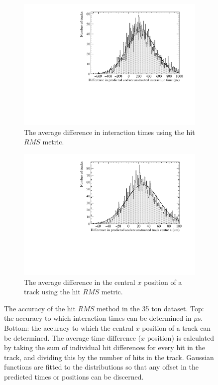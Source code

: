 \begin{figure}
  \centering
  \begin{subfigure}{0.6\textwidth}
    \centering
    \includegraphics[width=\textwidth]{Data_AvTimeDiff_RMS}
    \caption{The average difference in interaction times using the hit $RMS$ metric.}
    \label{fig:DiffDataAvDiff_RMS_T}
  \end{subfigure}

  \begin{subfigure}{0.6\textwidth}
    \centering
    \includegraphics[width=\textwidth]{Data_AvXPosDiff_RMS}
    \caption{The average difference in the central $x$ position of a track using the hit $RMS$ metric.}
    \label{fig:DiffDataAvDiff_RMS_X}
  \end{subfigure}
  \caption[The accuracy of the hit $RMS$ method in the 35 ton dataset]
          {The accuracy of the hit $RMS$ method in the 35 ton dataset. Top: the accuracy to which interaction times can be determined in $\mu$s. Bottom: the accuracy to which the central $x$ position of a track can be determined. The average time difference ($x$ position) is calculated by taking the sum of individual hit differences for every hit in the track, and dividing this by the number of hits in the track. Gaussian functions are fitted to the distributions so that any offset in the predicted times or positions can be discerned. }
  \label{fig:DiffDataAvDiff_RMS}
\end{figure}

